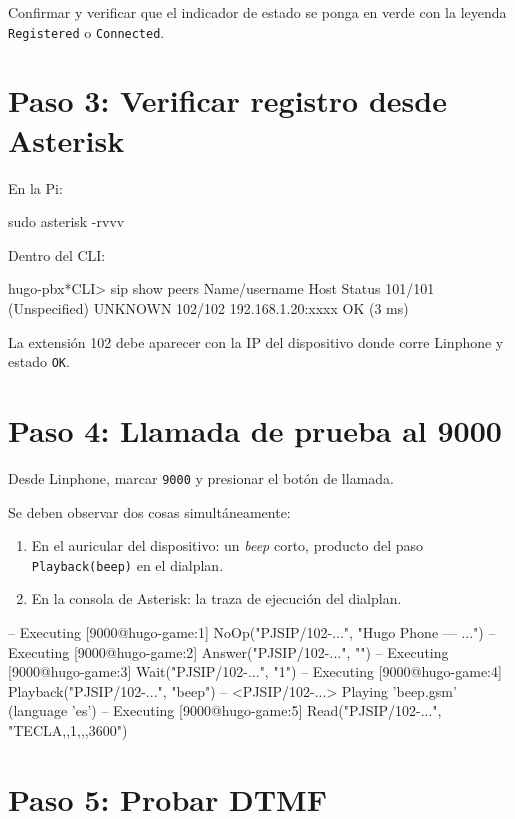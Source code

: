 Confirmar y verificar que el indicador de estado se ponga en verde con la leyenda \texttt{Registered} o \texttt{Connected}.

\section{Paso 3: Verificar registro desde Asterisk}

En la Pi:

\begin{shellcode}
sudo asterisk -rvvv
\end{shellcode}

Dentro del CLI:

\begin{plaincode}
hugo-pbx*CLI> sip show peers
Name/username             Host                Status
101/101                   (Unspecified)       UNKNOWN
102/102                   192.168.1.20:xxxx   OK (3 ms)
\end{plaincode}

La extensión 102 debe aparecer con la IP del dispositivo donde corre Linphone y estado \texttt{OK}.

\section{Paso 4: Llamada de prueba al 9000}

Desde Linphone, marcar \texttt{9000} y presionar el botón de llamada.

Se deben observar dos cosas simultáneamente:

\begin{enumerate}
  \item En el auricular del dispositivo: un \emph{beep} corto, producto del paso \texttt{Playback(beep)} en el dialplan.
  \item En la consola de Asterisk: la traza de ejecución del dialplan.
\end{enumerate}

\begin{plaincode}
-- Executing [9000@hugo-game:1] NoOp("PJSIP/102-...", "Hugo Phone — ...")
-- Executing [9000@hugo-game:2] Answer("PJSIP/102-...", "")
-- Executing [9000@hugo-game:3] Wait("PJSIP/102-...", "1")
-- Executing [9000@hugo-game:4] Playback("PJSIP/102-...", "beep")
-- <PJSIP/102-...> Playing 'beep.gsm' (language 'es')
-- Executing [9000@hugo-game:5] Read("PJSIP/102-...", "TECLA,,1,,,3600")
\end{plaincode}

\section{Paso 5: Probar DTMF}

